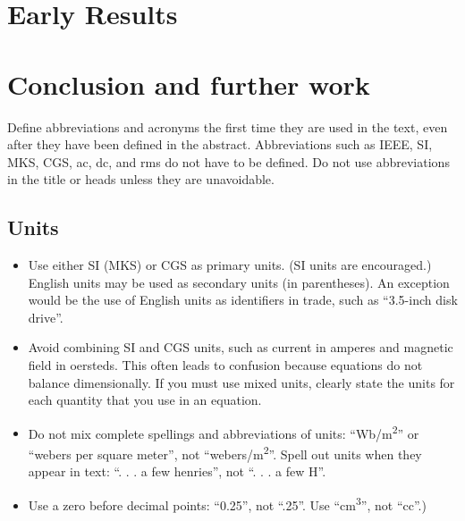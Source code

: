 \documentclass[conference]{IEEEtran}
\begin{document}

\section{Early Results}\label{sec:EarlyResults}

\section{Conclusion and further work}\label{sec:ConclusionFurtherWork}
Define abbreviations and acronyms the first time they are used in the text, 
even after they have been defined in the abstract. Abbreviations such as 
IEEE, SI, MKS, CGS, ac, dc, and rms do not have to be defined. Do not use 
abbreviations in the title or heads unless they are unavoidable.

\subsection{Units}
\begin{itemize}
\item Use either SI (MKS) or CGS as primary units. (SI units are encouraged.) English units may be used as secondary units (in parentheses). An exception would be the use of English units as identifiers in trade, such as ``3.5-inch disk drive''.
\item Avoid combining SI and CGS units, such as current in amperes and magnetic field in oersteds. This often leads to confusion because equations do not balance dimensionally. If you must use mixed units, clearly state the units for each quantity that you use in an equation.
\item Do not mix complete spellings and abbreviations of units: ``Wb/m\textsuperscript{2}'' or ``webers per square meter'', not ``webers/m\textsuperscript{2}''. Spell out units when they appear in text: ``. . . a few henries'', not ``. . . a few H''.
\item Use a zero before decimal points: ``0.25'', not ``.25''. Use ``cm\textsuperscript{3}'', not ``cc''.)
\end{itemize}
\end{document}
